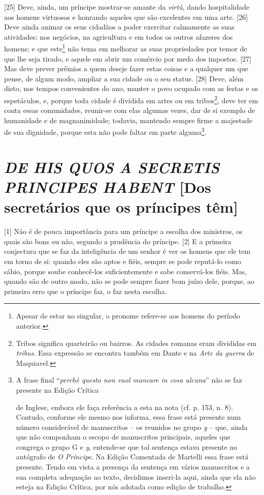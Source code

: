 {[}25{]} Deve, ainda, um príncipe mostrar-se amante da \emph{virtù},
dando hospitalidade aos homens virtuosos e honrando aqueles que são
excelentes em uma arte. {[}26{]} Deve ainda animar os seus cidadãos a
poder exercitar calmamente as suas atividades: nos negócios, na
agricultura e em todos os outros afazeres dos homens; e que
este\footnote{Apesar de estar no singular, o pronome refere-se aos
  homens do período anterior.} não tema em melhorar as suas propriedades
por temor de que lhe seja tirado, e aquele em abrir um comércio por medo
dos impostos. {[}27{]} Mas deve prever prêmios a quem deseje fazer estas
coisas e a qualquer um que pense, de algum modo, ampliar a sua cidade ou
o seu status. {[}28{]} Deve, além disto, nos tempos convenientes do ano,
manter o povo ocupado com as festas e os espetáculos, e, porque toda
cidade é dividida em artes ou em tribos\footnote{Tribos significa
  quarteirão ou bairros. As cidades romanas eram divididas em
  \emph{tribus}. Essa expressão se encontra também em Dante e na
  \emph{Arte da guerra} de Maquiavel.}, deve ter em conta essas
comunidades, reunir-se com elas algumas vezes, dar de si exemplo de
humanidade e de magnanimidade; todavia, mantendo sempre firme a
majestade de sua dignidade, porque esta não pode faltar em parte
alguma\footnote{A frase final ``\emph{perchè questo non vuol mancare in
  cosa alcuna}'' não se faz presente na Edição Crítica

  de Inglese, embora ele faça referência a esta na nota (cf. p. 153, n.
  8). Contudo, conforme ele mesmo nos informa, essa frase está presente
  num número considerável de manuscritos -- os reunidos no grupo
  \emph{y} -- que, ainda que não componham o escopo de manuscritos
  principais, aqueles que congrega o grupo G e \emph{y}, entende-se que
  tal sentença estava presente no autógrafo de \emph{O Príncipe}. Na
  Edição Comentada de Martelli essa frase está presente. Tendo em vista
  a presença da sentença em vários manuscritos e a sua completa
  adequação ao texto, decidimos inseri-la aqui, ainda que ela não esteja
  na Edição Crítica, por nós adotada como edição de trabalho.}.

\quebra\section{\emph{DE HIS QUOS A SECRETIS PRINCIPES HABENT}
{[}Dos secretários que os príncipes têm{]}}

{[}1{]} Não é de pouca importância para um príncipe a escolha dos
ministros, os quais são bons ou não, segundo a prudência do príncipe.
{[}2{]} E a primeira conjectura que se faz da inteligência de um senhor
é ver os homens que ele tem em torno de si: quando eles são aptos e
fiéis, sempre se pode reputá-lo como sábio, porque soube conhecê-los
suficientemente e sabe conservá-los fiéis. Mas, quando são de outro
modo, não se pode sempre fazer bom juízo dele, porque, ao primeiro erro
que o príncipe faz, o faz nesta escolha.

